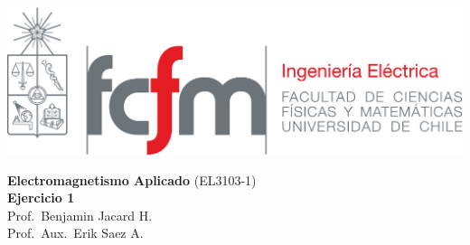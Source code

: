 \documentclass[
  11pt,
  letterpaper,
   addpoints,
  ]{exam}
\begin{document}
\noindent
\begin{minipage}{0.47\textwidth}
\includegraphics[width=\textwidth]{../fcfm_die}
\end{minipage}
\begin{minipage}{0.53\textwidth}
\begin{center} 
\large\textbf{Electromagnetismo Aplicado} (EL3103-1) \\
\large\textbf{Ejercicio 1} \\
\normalsize Prof.~Benjamin Jacard H.\\
\normalsize Prof.~Aux.~Erik Saez A.
\end{center}
\end{minipage}

\vspace{0.5cm}
\noindent
\vspace{.85cm}
\end{document}
